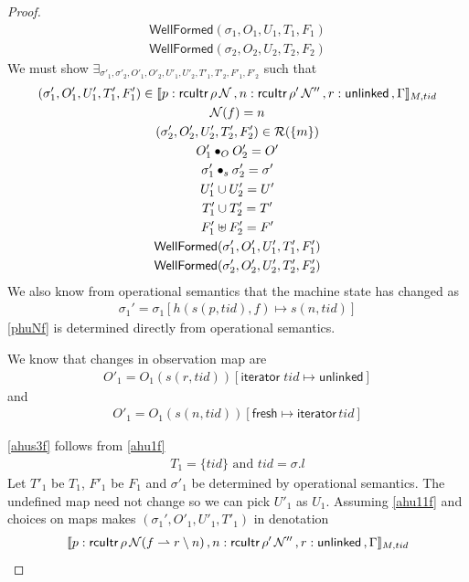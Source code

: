 \begin{proof}
\begin{gather}
\label{ahu16f}
\textsf{WellFormed}(\sigma_1,O_{1},U_{1},T_{1},F_1)
\\
\label{ahu17f}
\textsf{WellFormed}(\sigma_2,O_{2},U_{2},T_{2},F_2)
\end{gather}
We must show $\exists_{\sigma'_1, \sigma'_2, O'_{1}, O'_{2}, U'_{1}, U'_{2}, T'_{1}, T'_{2}, F'_1, F'_2}$ such that
\begin{gather}\label{phu5f}
\begin{aligned}
(\sigma_1',O'_{1},U'_{1}, T'_{1},F'_1)  \in \llbracket p:\textsf{rcuItr}\, \rho \, \mathcal{N} \, , n:\textsf{rcuItr}\, \rho' \, \mathcal{N}'' \, , r:\textsf{unlinked}\, ,  \Gamma \rrbracket_{M,tid}
\end{aligned}
\\
\label{phuNf}
\mathcal{N}(f)=n 
\\
\label{phu6f}
(\sigma_2',O'_{2},U'_{2}, T'_{2}, F'_2) \in \mathcal{R}(\{m\})
\\
\label{phu7f}
O'_{1} \bullet_{O} O'_{2} = O'
\\
\label{ahusigf'}
\sigma'_1 \bullet_s \sigma'_2 = \sigma' \\
\label{phu8f}
U'_{1} \cup U'_{2} = U'
\\
\label{phu9f}
T'_{1} \cup T'_{2} = T'
\\
\label{phufff}
F'_1 \uplus F'_2 = F'
\\
\label{phu10f}
\textsf{WellFormed}(\sigma_1',O'_{1},U'_{1},T'_{1},F'_1) \\
\label{phu11f}
\textsf{WellFormed}(\sigma_2',O'_{2},U'_{2},T'_{2},F'_2)
\end{gather}
We also know from operational semantics that the machine state has changed as
\begin{gather}\label{ahusf}
\sigma_1' =  \sigma_1[h(s(p,tid),f ) \mapsto s(n,tid) ]
\end{gather}
\ref{phuNf} is determined directly from operational semantics.

We know that changes in observation map are
\begin{gather}\label{ahus1f}
O'_1 =  O_1(s(r,tid))[\textsf{iterator}\;tid \mapsto \textsf{unlinked}]
\end{gather}
and
\begin{gather}\label{ahus2f}
O'_1 =  O_1(s(n,tid))[\textsf{fresh} \mapsto \textsf{iterator}\,tid]
\end{gather}

\ref{ahus3f} follows from \ref{ahu1f}
\begin{gather}\label{ahus3f}
  T_1 = \{tid\} \text{ and } tid = \sigma.l
\end{gather}
Let $T'_1$ be $T_1$, $F'_1$ be $F_1$ and $\sigma'_1$ be determined by operational semantics. The undefined map need not change so we can pick $U'_1$ as $U_1$. Assuming \ref{ahu11f} and choices on maps makes $(\sigma_1',O'_{1},U'_{1}, T'_{1})$ in denotation
\[\llbracket p:\textsf{rcuItr}\, \rho \, \mathcal{N}(f \rightharpoonup r \setminus n) \, , n:\textsf{rcuItr}\, \rho' \, \mathcal{N}'' \, , r:\textsf{unlinked}\, ,  \Gamma \rrbracket_{M,tid}\]


\end{proof}
